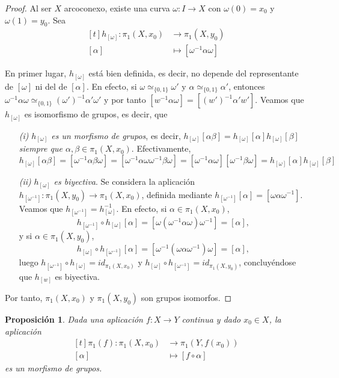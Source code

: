 \documentclass[11pt]{report}
\newtheorem{proposition}{Proposición}[chapter]
\theoremstyle{definition}
\theoremstyle{definition}
\theoremstyle{remark}
\begin{document}
\begin{proof}
Al ser $X$ arcoconexo, existe una curva $\omega \colon I \to X$ con $\omega(0)=x_0$ y $\omega(1)=y_0$. Sea
\[
\begin{aligned}[t]
h_{[\omega]} \colon \pi_1(X,x_0) &\longrightarrow \pi_1(X,y_0) \\
[\alpha] &\longmapsto [\omega^{-1}\alpha\omega]
\end{aligned}
\]

En primer lugar, $h_{[\omega]}$ está bien definida, es decir, no depende del representante de $[\omega]$ ni del de $[\alpha]$. En efecto, si $\omega \simeq_{\{0,1\}} \omega'$ y $\alpha \simeq_{\{0,1\}} \alpha'$, entonces $\omega^{-1}\alpha\omega \simeq_{\{0,1\}} (\omega')^{-1}\alpha'\omega'$ y por tanto $[w^{-1}\alpha\omega] = [(w')^{-1}\alpha'w']$. Veamos que $h_{[\omega]}$ es isomorfismo de grupos, es decir, que
\begin{itemize}
    \item[\textit{(i)}] \textit{$h_{[\omega]}$ es un morfismo de grupos}, es decir, \textit{$h_{[\omega]}[\alpha\beta] = h_{[\omega]}[\alpha]h_{[\omega]}[\beta]$ siempre que $\alpha,\beta \in \pi_1(X,x_0)$}. Efectivamente,
    \[h_{[\omega]}[\alpha\beta] = [\omega^{-1}\alpha\beta\omega] = [\omega^{-1}\alpha\omega\omega^{-1}\beta\omega] = [\omega^{-1}\alpha\omega][\omega^{-1}\beta\omega] = h_{[\omega]}[\alpha]h_{[\omega]}[\beta]\]
    \item[\textit{(ii)}] \textit{$h_{[\omega]}$ es biyectiva}. Se considera la aplicación $h_{[\omega^{-1}]} \colon \pi_1(X,y_0) \longrightarrow \pi_1(X,x_0)$, definida mediante $h_{[\omega^{-1}]}[\alpha] = [\omega\alpha\omega^{-1}]$. Veamos que $h_{[\omega^{-1}]} = h_{[\omega]}^{-1}$. En efecto, si $\alpha \in \pi_1(X,x_0)$,
\[h_{[\omega^{-1}]}\circ h_{[\omega]}[\alpha] = [\omega(\omega^{-1}\alpha\omega)\omega^{-1}] = [\alpha],\]
y si $\alpha \in \pi_1(X,y_0)$,
\[h_{[\omega]} \circ h_{[\omega^{-1}]}[\alpha] = [\omega^{-1}(\omega \alpha \omega^{-1})\omega] = [\alpha],\]
luego $h_{[\omega^{-1}]} \circ h_{[\omega]} = id_{\pi_1(X,x_0)}$ y $h_{[\omega]} \circ h_{[\omega^{-1}]} = id_{\pi_1(X,y_0)}$, concluyéndose que $h_{[w]}$ es biyectiva.
\end{itemize}
Por tanto, $\pi_1(X,x_0)$ y $\pi_1(X,y_0)$ son grupos isomorfos.
\end{proof}

\begin{proposition}
\label{prop2.8.}
Dada una aplicación $f \colon X \to Y$ continua y dado $x_0 \in X$, la aplicación
\[
\begin{aligned}[t]
\pi_1(f) \colon \pi_1(X,x_0) &\longrightarrow \pi_1(Y,f(x_0)) \\
[\alpha] &\longmapsto [f \circ \alpha]
\end{aligned}
\]
es un morfismo de grupos.
\end{proposition}
\end{document}
